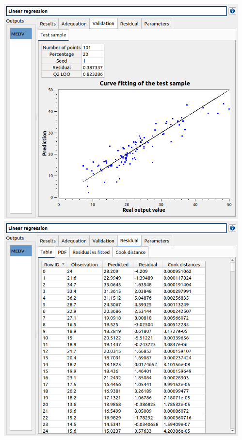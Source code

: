 \documentclass[aspectratio=169]{beamer}
\begin{document}
\begin{frame}
\begin{columns}
\begin{center}
    \end{center}


    \begin{center}
      \includegraphics[width=\textwidth]{figures/linearModel5.png}
      \includegraphics[width=\textwidth]{figures/linearModel6.png}
    \end{center}


\end{columns}
\end{frame}
\end{document}
